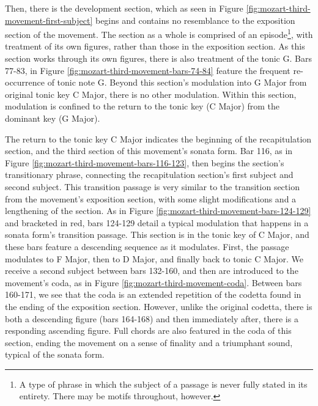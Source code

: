 Then, there is the development section, which as seen in Figure \ref{fig:mozart-third-movement-first-subject}\autocite{Henle_1977} begins and contains no resemblance to the exposition section of the movement. The section as a whole is comprised of an episode\footnote{A type of phrase in which the subject of a passage is never fully stated in its entirety. There may be motifs throughout, however.}, with treatment of its own figures, rather than those in the exposition section. As this section works through its own figures, there is also treatment of the tonic G. Bars 77-83, in Figure \ref{fig:mozart-third-movement-bars-74-84}\autocite{Henle_1977} feature the frequent re-occurrence of tonic note G. Beyond this section's modulation into G Major from original tonic key C Major, there is no other modulation. Within this section, modulation is confined to the return to the tonic key (C Major) from the dominant key (G Major).

The return to the tonic key C Major indicates the beginning of the recapitulation section, and the third section of this movement's sonata form. Bar 116, as in Figure \ref{fig:mozart-third-movement-bars-116-123}\autocite{Henle_1977}, then begins the section's transitionary phrase, connecting the recapitulation section's first subject and second subject. This transition passage is very similar to the transition section from the movement's exposition section, with some slight modifications and a lengthening of the section. As in Figure \ref{fig:mozart-third-movement-bars-124-129}\autocite{Henle_1977} and bracketed in red, bars 124-129 detail a typical modulation that happens in a sonata form's transition passage. This section is in the tonic key of C Major, and these bars feature a descending sequence as it modulates. First, the passage modulates to F Major, then to D Major, and finally back to tonic C Major. We receive a second subject between bars 132-160, and then are introduced to the movement's coda, as in Figure \ref{fig:mozart-third-movement-coda}\autocite{Henle_1977}. Between bars 160-171, we see that the coda is an extended repetition of the codetta found in the ending of the exposition section. However, unlike the original codetta, there is both a descending figure (bars 164-168) and then immediately after, there is a responding ascending figure. Full chords are also featured in the coda of this section, ending the movement on a sense of finality and a triumphant sound, typical of the sonata form.

